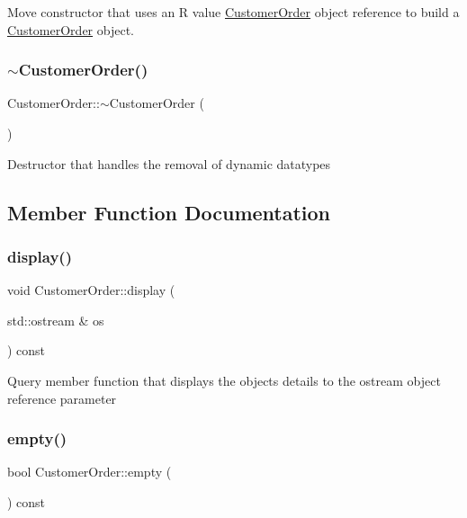 Move constructor that uses an R value \mbox{\hyperlink{classCustomerOrder}{Customer\+Order}} object reference to build a \mbox{\hyperlink{classCustomerOrder}{Customer\+Order}} object. \mbox{\label{classCustomerOrder_ae36af98287386c97b66537ac463b09c6}} 
\subsubsection{\texorpdfstring{$\sim$\+Customer\+Order()}{~CustomerOrder()}}
{\footnotesize\ttfamily Customer\+Order\+::$\sim$\+Customer\+Order (\begin{DoxyParamCaption}{ }\end{DoxyParamCaption})}

Destructor that handles the removal of dynamic datatypes 

\subsection{Member Function Documentation}
\mbox{\label{classCustomerOrder_a44b8223600dd858b4d4edcbe3704a5a0}} 
\subsubsection{\texorpdfstring{display()}{display()}}
{\footnotesize\ttfamily void Customer\+Order\+::display (\begin{DoxyParamCaption}\item[{std\+::ostream \&}]{os }\end{DoxyParamCaption}) const}

Query member function that displays the object\textquotesingle{}s details to the ostream object reference parameter \mbox{\label{classCustomerOrder_a8cfde59bf7a044e21508f5b595e3873c}} 
\subsubsection{\texorpdfstring{empty()}{empty()}}
{\footnotesize\ttfamily bool Customer\+Order\+::empty (\begin{DoxyParamCaption}{ }\end{DoxyParamCaption}) const}

